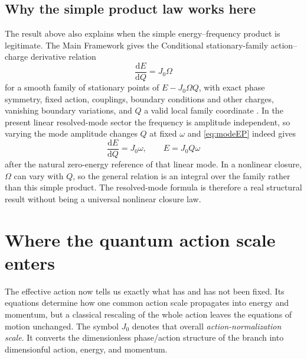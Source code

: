 \documentclass[11pt]{article}
\theoremstyle{definition}
\newcommand{\dd}{\mathrm{d}}
\begin{document}
\subsection{Why the simple product law works here}

The result above also explains when the simple energy--frequency product is legitimate.  The
Main Framework gives the Conditional stationary-family action--charge derivative relation
\begin{equation}
 \frac{\dd E}{\dd Q}=J_0\Omega
 \label{eq:conjugacy}
\end{equation}
for a smooth family of stationary points of $E-J_0\Omega Q$, with exact
phase symmetry, fixed action, couplings, boundary conditions and other
charges, vanishing boundary variations, and $Q$ a valid local family coordinate
\cite{CmotionMainFramework2026}.  In the present linear resolved-mode sector the frequency is
amplitude independent, so varying the mode amplitude changes $Q$ at fixed $\omega$ and
\eqref{eq:modeEP} indeed gives
\begin{equation}
 \frac{\dd E}{\dd Q}=J_0\omega,
 \qquad E=J_0Q\omega
\end{equation}
after the natural zero-energy reference of that linear mode.  In a nonlinear closure, $\Omega$
can vary with $Q$, so the general relation is an integral over the family rather than this simple
product.  The resolved-mode formula is
therefore a real structural result without being a universal nonlinear closure law.

\section{Where the quantum action scale enters}
\label{sec:normalization}

The effective action now tells us exactly what has and has not been fixed.  Its equations determine
how one common action scale propagates into energy and momentum, but a classical rescaling of
the whole action leaves the equations of motion unchanged.  The symbol $J_0$ denotes that
overall \emph{action-normalization scale}.  It converts the dimensionless phase/action
structure of the branch into dimensionful action, energy, and momentum.
\end{document}
